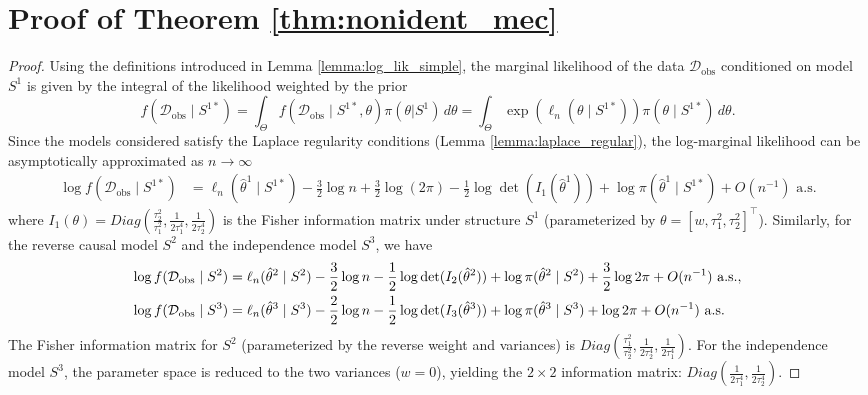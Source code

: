 \documentclass[accepted]{uai2026} %
\newcommand{\train}{\mathcal{D}}
\newcommand{\obsdata}{\train_{\text{obs}}}
\def\transpose{\intercal}
\theoremstyle{boldremark}
\begin{document}
\section{Proof of Theorem \ref{thm:nonident_mec}}
\label{appendix:proof_thm1_nonident}
\begin{proof}
    Using the definitions introduced in Lemma \ref{lemma:log_lik_simple}, the marginal likelihood of the data $\obsdata$ conditioned on model $S^1$ is given by the integral of the likelihood weighted by the prior
    \begin{equation}
        f(\obsdata\mid S^{1*}) = \int_{\Theta} f(\obsdata\mid S^{1*}, \theta)\pi(\theta|S^1) \, d\theta = \int_{\Theta} \exp\left(\ell_n( \theta\mid S^{1*})\right)\pi(\theta\mid S^{1*}) \, d\theta.
    \end{equation}
    Since the models considered satisfy the Laplace regularity conditions (Lemma \ref{lemma:laplace_regular}), the log-marginal likelihood can be asymptotically approximated as $n \to \infty$
    \begin{align*}
        \log f(\obsdata\mid S^{1*}) &= \ell_n(\hat{\theta}^1\mid S^{1*}) - \frac{3}{2}\log n + \frac{3}{2}\log(2\pi) - \frac{1}{2}\log \det(I_1(\hat{\theta}^1)) + \log \pi(\hat{\theta}^1\mid S^{1*}) + O(n^{-1}) \text{ a.s.}
    \end{align*}
    where $I_1(\theta) =  Diag\left(  \frac{\tau_2^2}{\tau_1^2}, \frac{1}{2\tau_1^4}, \frac{1}{2\tau_2^4} \right)$ is the Fisher information matrix under structure $S^1$ (parameterized by $\theta = [w, \tau_1^2, \tau_2^2]^\transpose$).
    Similarly, for the reverse causal model $S^2$ and the independence model $S^3$, we have
    \begin{align}
        \label{eq:Laplace_approx_nonident}
        \noindent \log f(\obsdata\mid S^2) &= \ell_n(\hat{\theta}^2\mid S^2) - \frac{3}{2}\log n - \frac{1}{2}\log \det(I_2(\hat{\theta}^2)) + \log \pi(\hat{\theta}^2\mid S^2) + \frac{3}{2}\log 2\pi + O(n^{-1})\text{ a.s.}, \\
        \log f(\obsdata\mid S^3) &= \ell_n(\hat{\theta}^3\mid S^3) - \frac{2}{2}\log n - \frac{1}{2}\log \det(I_3(\hat{\theta}^3)) + \log \pi(\hat{\theta}^3\mid S^3) + \log 2\pi + O(n^{-1}) \text{ a.s.}
    \end{align}
    The Fisher information matrix for $S^2$ (parameterized by the reverse weight and variances) is $Diag\left( \frac{\tau_1^2}{\tau_2^2}, \frac{1}{2\tau_2^4}, \frac{1}{2\tau_1^4} \right)$. For the independence model $S^3$, the parameter space is reduced to the two variances ($w=0$), yielding the $2 \times 2$ information matrix: $Diag \left(\frac{1}{2\tau_1^4}, \frac{1}{2\tau_2^4} \right)$.
    

\end{proof}
\end{document}
